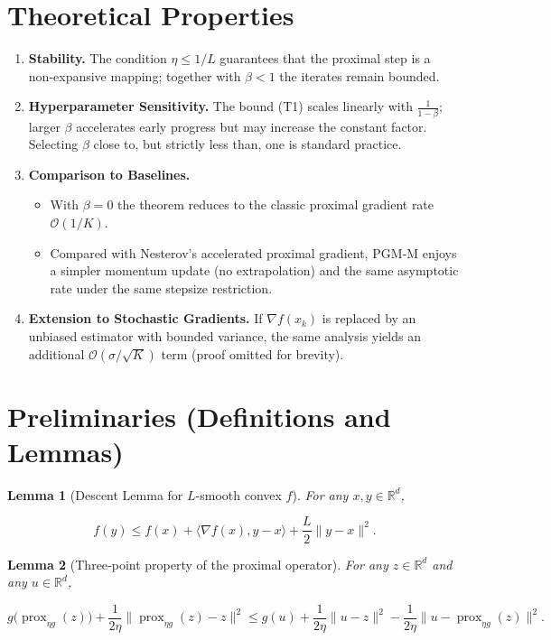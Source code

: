 \documentclass{article}
\newtheorem{lemma}{Lemma}
\newcommand{\prox}{\operatorname{prox}}
\begin{document}
\section*{Theoretical Properties}
\begin{enumerate}[leftmargin=*, label=\arabic*.]
\item \textbf{Stability.} The condition \(\eta\le 1/L\) guarantees that the proximal step is a non‑expansive mapping; together with \(\beta<1\) the iterates remain bounded.
\item \textbf{Hyperparameter Sensitivity.} The bound (T1) scales linearly with \(\frac{1}{1-\beta}\); larger \(\beta\) accelerates early progress but may increase the constant factor. Selecting \(\beta\) close to, but strictly less than, one is standard practice.
\item \textbf{Comparison to Baselines.}
\begin{itemize}
\item With \(\beta=0\) the theorem reduces to the classic proximal gradient rate \(\mathcal O(1/K)\).
\item Compared with Nesterov’s accelerated proximal gradient, PGM‑M enjoys a simpler momentum update (no extrapolation) and the same asymptotic rate under the same stepsize restriction.
\end{itemize}
\item \textbf{Extension to Stochastic Gradients.} If \(\nabla f(x_k)\) is replaced by an unbiased estimator with bounded variance, the same analysis yields an additional \(\mathcal O(\sigma/\sqrt{K})\) term (proof omitted for brevity).
\end{enumerate}

\section*{Preliminaries (Definitions and Lemmas)}
\begin{lemma}[Descent Lemma for \(L\)-smooth convex \(f\)]\label{lem:descent}
For any \(x,y\in\mathbb{R}^d\),

\[
f(y)\le f(x)+\langle\nabla f(x),y-x\rangle+\frac{L}{2}\|y-x\|^{2}.
\tag{L1}
\]
\end{lemma}

\begin{lemma}[Three‑point property of the proximal operator]\label{lem:prox}
For any \(z\in\mathbb{R}^d\) and any \(u\in\mathbb{R}^d\),

\[
g\bigl(\prox_{\eta g}(z)\bigr)+\frac{1}{2\eta}\bigl\|\prox_{\eta g}(z)-z\bigr\|^{2}
\le g(u)+\frac{1}{2\eta}\bigl\|u-z\bigr\|^{2}
-\frac{1}{2\eta}\bigl\|u-\prox_{\eta g}(z)\bigr\|^{2}.
\tag{L2}
\]
\end{lemma}
\end{document}
